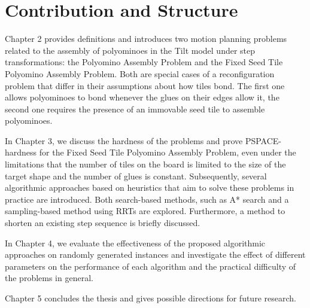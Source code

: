 \section{Contribution and Structure}
Chapter 2 provides definitions and introduces two motion planning problems related to the assembly of polyominoes in the Tilt model under step transformations: the Polyomino Assembly Problem and the Fixed Seed Tile Polyomino Assembly Problem.
Both are special cases of a reconfiguration problem that differ in their assumptions about how tiles bond. The first one allows polyominoes to bond whenever the glues on their edges allow it, the second one requires the presence of an immovable seed tile to assemble polyominoes. \par
In Chapter 3, we discuss the hardness of the problems and prove PSPACE-hardness for the Fixed Seed Tile Polyomino Assembly Problem, even under the limitations that the number of tiles on the board is limited to the size of the target shape and the number of glues is constant.
Subsequently, several algorithmic approaches based on heuristics that aim to solve these problems in practice are introduced. Both search-based methods, such as A* search and a sampling-based method using RRTs are explored. Furthermore, a method to shorten an existing step sequence is briefly discussed. \par
In Chapter 4, we evaluate the effectiveness of the proposed algorithmic approaches on randomly generated instances and investigate the effect of different parameters on the performance of each algorithm and the practical difficulty of the problems in general.\par
Chapter 5 concludes the thesis and gives possible directions for future research.
